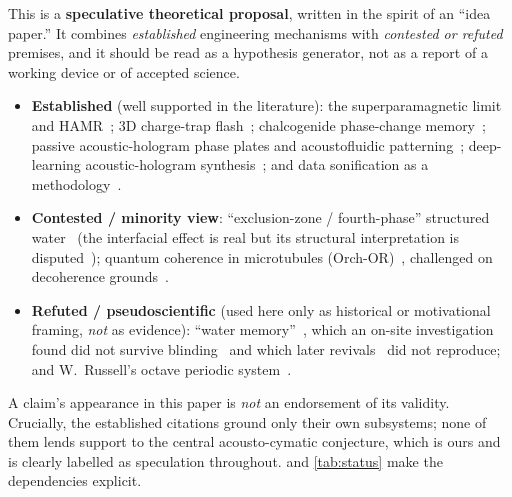 \documentclass[11pt]{article}
\theoremstyle{definition}
\begin{document}
\begin{epistemic}
This is a \textbf{speculative theoretical proposal}, written in the spirit of an
``idea paper.'' It combines \emph{established} engineering mechanisms with
\emph{contested or refuted} premises, and it should be read as a hypothesis generator,
not as a report of a working device or of accepted science.
\begin{itemize}[leftmargin=1.4em,nosep]
  \item \textbf{Established} (well supported in the literature): the superparamagnetic
  limit and HAMR~\cite{charap1997,wellermoser1999,kryder2008hamr,challener2009};
  3D charge-trap flash~\cite{white2000sonos,tanaka2007bics,goda2020}; chalcogenide
  phase-change memory~\cite{ovshinsky1968,wuttig2007pcm,raoux2010pcm}; passive
  acoustic-hologram phase plates and acoustofluidic
  patterning~\cite{melde2016holograms,marzo2015holographic,rufo2022acoustofluidics};
  deep-learning acoustic-hologram synthesis~\cite{lin2021dlholograms}; and data
  sonification as a methodology~\cite{kramer1999nsf,hermann2011handbook}.
  \item \textbf{Contested / minority view}: ``exclusion-zone / fourth-phase'' structured
  water~\cite{pollack2013fourth} (the interfacial effect is real but its structural
  interpretation is disputed~\cite{elton2020ez}); quantum coherence in microtubules
  (Orch-OR)~\cite{hameroff2014orchor}, challenged on decoherence
  grounds~\cite{tegmark2000decoherence}.
  \item \textbf{Refuted / pseudoscientific} (used here only as historical or motivational
  framing, \emph{not} as evidence): ``water memory''~\cite{benveniste1988}, which an
  on-site investigation found did not survive blinding~\cite{maddox1988} and which later
  revivals~\cite{montagnier2009} did not reproduce; and W.~Russell's octave periodic
  system~\cite{russell1926universalone}.
\end{itemize}
A claim's appearance in this paper is \emph{not} an endorsement of its validity. Crucially,
the established citations ground only their own subsystems; none of them lends support to
the central acousto-cymatic conjecture, which is ours and is clearly labelled as
speculation throughout.  and \cref{tab:status} make the dependencies
explicit.
\end{epistemic}

\end{document}
